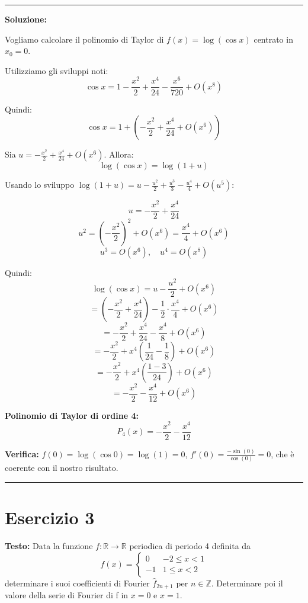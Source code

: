 \documentclass[12pt, a4paper]{article}
\newenvironment{solution}
{\par\noindent\rule{\textwidth}{0.4pt}\par\textbf{Soluzione:}\medskip\par}
{\par\rule{\textwidth}{0.4pt}\par\bigskip}
\begin{document}
\begin{solution}
Vogliamo calcolare il polinomio di Taylor di $f(x) = \log(\cos x)$ centrato in $x_0 = 0$.

Utilizziamo gli sviluppi noti:
\[
\cos x = 1 - \frac{x^2}{2} + \frac{x^4}{24} - \frac{x^6}{720} + O(x^8)
\]

Quindi:
\[
\cos x = 1 + \left(-\frac{x^2}{2} + \frac{x^4}{24} + O(x^6)\right)
\]

Sia $u = -\frac{x^2}{2} + \frac{x^4}{24} + O(x^6)$. Allora:
\[
\log(\cos x) = \log(1 + u)
\]

Usando lo sviluppo $\log(1 + u) = u - \frac{u^2}{2} + \frac{u^3}{3} - \frac{u^4}{4} + O(u^5)$:

\[
u = -\frac{x^2}{2} + \frac{x^4}{24}
\]
\[
u^2 = \left(-\frac{x^2}{2}\right)^2 + O(x^6) = \frac{x^4}{4} + O(x^6)
\]
\[
u^3 = O(x^6), \quad u^4 = O(x^8)
\]

Quindi:
\[
\log(\cos x) = u - \frac{u^2}{2} + O(x^6)
\]
\[
= \left(-\frac{x^2}{2} + \frac{x^4}{24}\right) - \frac{1}{2} \cdot \frac{x^4}{4} + O(x^6)
\]
\[
= -\frac{x^2}{2} + \frac{x^4}{24} - \frac{x^4}{8} + O(x^6)
\]
\[
= -\frac{x^2}{2} + x^4\left(\frac{1}{24} - \frac{1}{8}\right) + O(x^6)
\]
\[
= -\frac{x^2}{2} + x^4\left(\frac{1 - 3}{24}\right) + O(x^6)
\]
\[
= -\frac{x^2}{2} - \frac{x^4}{12} + O(x^6)
\]

\textbf{Polinomio di Taylor di ordine 4:}
\[
P_4(x) = -\frac{x^2}{2} - \frac{x^4}{12}
\]

\textbf{Verifica:} $f(0) = \log(\cos 0) = \log(1) = 0$, $f'(0) = \frac{-\sin(0)}{\cos(0)} = 0$, che è coerente con il nostro risultato.
\end{solution}

\newpage

\section*{Esercizio 3}

\textbf{Testo:} Data la funzione $f: \mathbb{R} \rightarrow \mathbb{R}$ periodica di periodo 4 definita da
\[ f(x) = \begin{cases} 0 & -2 \le x < 1 \\ -1 & 1 \le x < 2 \end{cases} \]
determinare i suoi coefficienti di Fourier $\hat{f}_{2n+1}$ per $n \in \mathbb{Z}$. Determinare poi il valore della serie di Fourier di f in $x=0$ e $x=1$.
\end{document}
